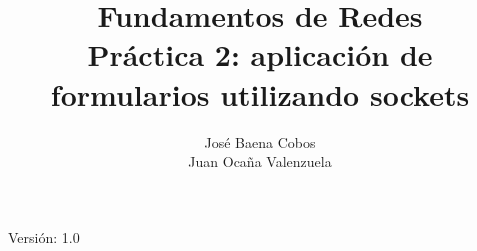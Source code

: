 \documentclass[11pt,a4paper]{article}
\author{	José Baena Cobos \\ Juan Ocaña Valenzuela}
\title{\textbf{Fundamentos de Redes} \\ 
 Práctica 2: aplicación de formularios utilizando sockets}
\begin{document}
\thispagestyle{empty}

\maketitle

\begin{center}

Versión: 1.0
\end{center}

\newpage

\tableofcontents

\newpage
\end{document}
